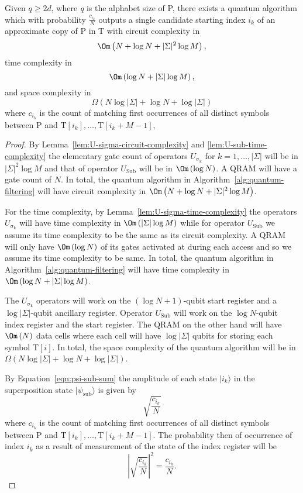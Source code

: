 \begin{theorem}\label{lem:quantum-filtering}
Given $q \geq 2d$, where \textit{q} is the alphabet size of P, there exists a quantum algorithm which with probability $\frac{c_{i_k}}{N}$ outputs a single candidate starting index $i_k$ of an approximate copy of P in T with circuit complexity in
\[
	\Om\left(N + \log N + \vert \Sigma \vert^2\log M \right),
\]
time complexity in
\[
	\Om\left( \log N + \vert \Sigma \vert\log M \right),
\]
and space complexity in
\[
	\Omega\left( N\log\vert \Sigma \vert + \log N + \log \vert \Sigma \vert \right)
\]
where $c_{i_k}$ is the count of matching first occurrences of all distinct symbols between $\mathrm{P}$ and $\mathrm{T}[i_k],\ldots,\mathrm{T}[i_k+M-1]$, 
\end{theorem}
\begin{proof}
By Lemma~\ref{lem:U-sigma-circuit-complexity} and \ref{lem:U-sub-time-complexity} the elementary gate count of operators $U_{\mathrm{\sigma_k}}$ for $k=1,\ldots,\vert \Sigma \vert$ will be in $\vert \Sigma \vert^2\log M$ and that of operator $U_{\mathrm{Sub}}$ will be in $\Om\left( \log N \right)$. A QRAM will have a gate count of $N$. In total, the quantum algorithm in Algorithm~\ref{alg:quantum-filtering} will have circuit complexity in $\Om\left( N + \log N + \vert \Sigma \vert^2\log M \right)$.

For the time complexity, by Lemma~\ref{lem:U-sigma-time-complexity} the operators $U_{\mathrm{\sigma_k}}$ will have time complexity in $\Om\left(\vert \Sigma \vert \log M\right)$ while for operator $U_{\mathrm{Sub}}$ we assume its time complexity to be the same as its circuit complexity. A QRAM will only have $\Om\left( \log N \right)$ of its gates activated at during each access \cite{Giovannetti2008} and so we assume its time complexity to be same. In total, the quantum algorithm in Algorithm~\ref{alg:quantum-filtering} will have time complexity in $\Om\left( \log N + \vert \Sigma \vert\log M \right)$.

The $U_{\mathrm{\sigma_k}}$ operators will work on the $(\log N + 1)$-qubit start register and a $\log \vert \Sigma \vert$-qubit ancillary register. Operator $U_{\mathrm{Sub}}$ will work on the $\log N$-qubit index register and the start register. The QRAM on the other hand will have $\Om\left( N \right)$ data cells where each cell will have $\log \vert \Sigma \vert$ qubits for storing each symbol $\mathrm{T}[i]$. In total, the space complexity of the quantum algorithm will be in $\Omega\left( N\log\vert \Sigma \vert + \log N + \log \vert \Sigma \vert \right)$. 

By Equation~\ref{eqn:psi-sub-sum} the amplitude of each state $\vert i_k \rangle$ in the superposition state $\vert \psi_{\mathrm{sub}} \rangle$ is given by 
\[
	\sqrt{\frac{c_{i_k}}{N}}
\]
where $c_{i_k}$ is the count of matching first occurrences of all distinct symbols between $\mathrm{P}$ and $\mathrm{T}[i_k],\ldots,\mathrm{T}[i_k+M-1]$. The probability then of occurrence of index $i_k$ as a result of measurement of the state of the index register will be 
\[
	\left\vert \sqrt{\frac{c_{i_k}}{N}} \right\vert^2 = \frac{c_{i_k}}{N}.
\]
\end{proof}


